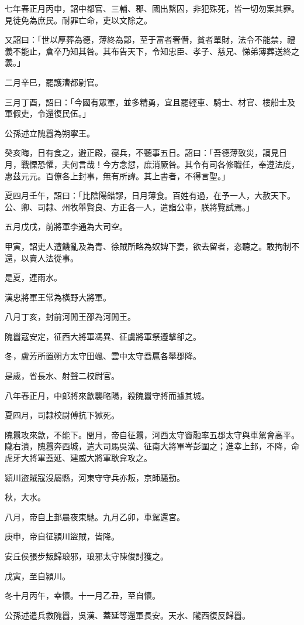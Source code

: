 \begin{pinyinscope}
七年春正月丙申，詔中都官、三輔、郡、國出繫囚，非犯殊死，皆一切勿案其罪。見徒免為庶民。耐罪亡命，吏以文除之。

又詔曰：「世以厚葬為德，薄終為鄙，至于富者奢僭，貧者單財，法令不能禁，禮義不能止，倉卒乃知其咎。其布告天下，令知忠臣、孝子、慈兄、悌弟薄葬送終之義。」

二月辛巳，罷護漕都尉官。

三月丁酉，詔曰：「今國有眾軍，並多精勇，宜且罷輕車、騎士、材官、樓船士及軍假吏，令還復民伍。」

公孫述立隗囂為朔寧王。

癸亥晦，日有食之，避正殿，寑兵，不聽事五日。詔曰：「吾德薄致災，謫見日月，戰慄恐懼，夫何言哉！今方念愆，庶消厥咎。其令有司各修職任，奉遵法度，惠茲元元。百僚各上封事，無有所諱。其上書者，不得言聖。」

夏四月壬午，詔曰：「比陰陽錯謬，日月薄食。百姓有過，在予一人，大赦天下。公、卿、司隸、州牧舉賢良、方正各一人，遣詣公車，朕將覽試焉。」

五月戊戌，前將軍李通為大司空。

甲寅，詔吏人遭饑亂及為青、徐賊所略為奴婢下妻，欲去留者，恣聽之。敢拘制不還，以賣人法從事。

是夏，連雨水。

漢忠將軍王常為橫野大將軍。

八月丁亥，封前河閒王邵為河閒王。

隗囂寇安定，征西大將軍馮異、征虜將軍祭遵擊卻之。

冬，盧芳所置朔方太守田颯、雲中太守喬扈各舉郡降。

是歲，省長水、射聲二校尉官。

八年春正月，中郎將來歙襲略陽，殺隗囂守將而據其城。

夏四月，司隸校尉傅抗下獄死。

隗囂攻來歙，不能下。閏月，帝自征囂，河西太守竇融率五郡太守與車駕會高平。隴右潰，隗囂奔西城，遣大司馬吳漢、征南大將軍岑彭圍之；進幸上邽，不降，命虎牙大將軍蓋延、建威大將軍耿弇攻之。

潁川盜賊寇沒屬縣，河東守守兵亦叛，京師騷動。

秋，大水。

八月，帝自上邽晨夜東馳。九月乙卯，車駕還宮。

庚申，帝自征潁川盜賊，皆降。

安丘侯張步叛歸琅邪，琅邪太守陳俊討獲之。

戊寅，至自潁川。

冬十月丙午，幸懷。十一月乙丑，至自懷。

公孫述遣兵救隗囂，吳漢、蓋延等還軍長安。天水、隴西復反歸囂。


\end{pinyinscope}
